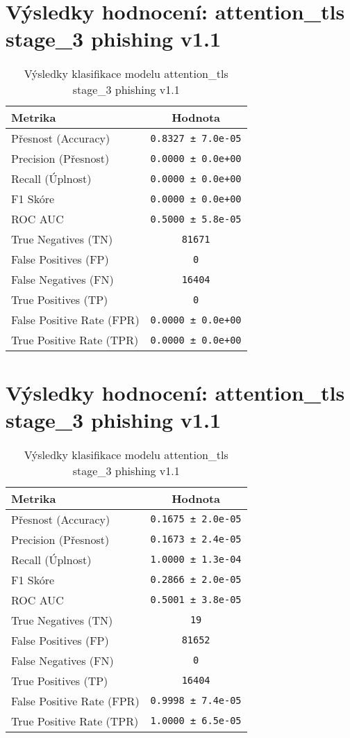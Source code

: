 \section*{Výsledky hodnocení: attention_tls stage_3 phishing v1.1}
\begin{table}[h!]
\centering
\begin{tabular}{|l|c|}
\hline
\textbf{Metrika} & \textbf{Hodnota} \\
\hline
Přesnost (Accuracy) & \texttt{0.8327 ± 7.0e-05} \\
Precision (Přesnost) & \texttt{0.0000 ± 0.0e+00} \\
Recall (Úplnost) & \texttt{0.0000 ± 0.0e+00} \\
F1 Skóre & \texttt{0.0000 ± 0.0e+00} \\
ROC AUC & \texttt{0.5000 ± 5.8e-05} \\
True Negatives (TN) & \texttt{81671} \\
False Positives (FP) & \texttt{0} \\
False Negatives (FN) & \texttt{16404} \\
True Positives (TP) & \texttt{0} \\
False Positive Rate (FPR) & \texttt{0.0000 ± 0.0e+00} \\
True Positive Rate (TPR) & \texttt{0.0000 ± 0.0e+00} \\
\hline
\end{tabular}
\caption{Výsledky klasifikace modelu attention_tls stage_3 phishing v1.1}
\label{tab:phishing_attention_tls}
\end{table}

\section*{Výsledky hodnocení: attention_tls stage_3 phishing v1.1}
\begin{table}[h!]
\centering
\begin{tabular}{|l|c|}
\hline
\textbf{Metrika} & \textbf{Hodnota} \\
\hline
Přesnost (Accuracy) & \texttt{0.1675 ± 2.0e-05} \\
Precision (Přesnost) & \texttt{0.1673 ± 2.4e-05} \\
Recall (Úplnost) & \texttt{1.0000 ± 1.3e-04} \\
F1 Skóre & \texttt{0.2866 ± 2.0e-05} \\
ROC AUC & \texttt{0.5001 ± 3.8e-05} \\
True Negatives (TN) & \texttt{19} \\
False Positives (FP) & \texttt{81652} \\
False Negatives (FN) & \texttt{0} \\
True Positives (TP) & \texttt{16404} \\
False Positive Rate (FPR) & \texttt{0.9998 ± 7.4e-05} \\
True Positive Rate (TPR) & \texttt{1.0000 ± 6.5e-05} \\
\hline
\end{tabular}
\caption{Výsledky klasifikace modelu attention_tls stage_3 phishing v1.1}
\label{tab:phishing_attention_tls}
\end{table}

